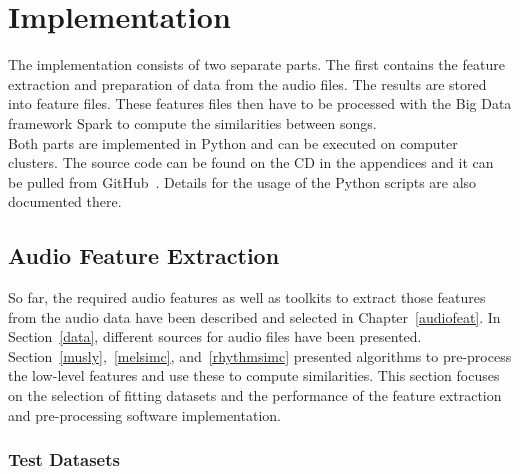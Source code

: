 \chapter{Implementation}\label{implementationdet}

The implementation consists of two separate parts. The first contains the feature extraction and preparation of data from the audio files. The results are stored into feature files. These features files then have to be processed with the Big Data framework Spark to compute the similarities between songs.\\ 
Both parts are implemented in Python and can be executed on computer clusters. The source code can be found on the CD in the appendices and it can be pulled from GitHub~\cite{github-code}. Details for the usage of the Python scripts are also documented there.

\section{Audio Feature Extraction}\label{simmet}

So far, the required audio features as well as toolkits to extract those features from the audio data have been described and selected in Chapter~\ref{audiofeat}.
In Section~\ref{data}, different sources for audio files have been presented. Section~\ref{musly},~\ref{melsimc}, and~\ref{rhythmsimc} presented algorithms to pre-process the low-level features and use these to compute similarities. 
This section focuses on the selection of fitting datasets %
and the performance of the feature extraction and pre-processing software implementation.  

\subsection{Test Datasets}\label{tdset}

